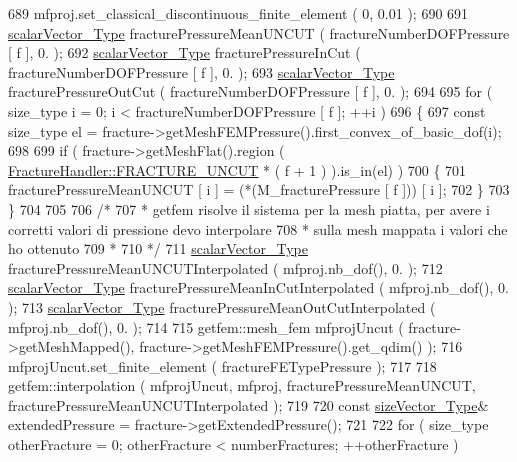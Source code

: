 \begin{DoxyCode}
689         mfproj.set\_classical\_discontinuous\_finite\_element ( 0, 0.01 );
690 
691         \hyperlink{Core_8h_a4e75b5863535ba1dd79942de2846eff0}{scalarVector\_Type} fracturePressureMeanUNCUT ( fractureNumberDOFPressure [ f ], 0. 
      );
692         \hyperlink{Core_8h_a4e75b5863535ba1dd79942de2846eff0}{scalarVector\_Type} fracturePressureInCut ( fractureNumberDOFPressure [ f ], 0. );
693         \hyperlink{Core_8h_a4e75b5863535ba1dd79942de2846eff0}{scalarVector\_Type} fracturePressureOutCut ( fractureNumberDOFPressure [ f ], 0. );
694 
695         \textcolor{keywordflow}{for} ( size\_type i = 0; i < fractureNumberDOFPressure [ f ]; ++i )
696         \{
697             \textcolor{keyword}{const} size\_type el =  fracture->getMeshFEMPressure().first\_convex\_of\_basic\_dof(i);
698         
699             \textcolor{keywordflow}{if} ( fracture->getMeshFlat().region ( 
      \hyperlink{classFractureHandler_a495ad4fc72d0c47c8f0424842f1153aaaa992cc3ad024a030ecd798dc319c95ac}{FractureHandler::FRACTURE\_UNCUT} * ( f + 1 ) ).is\_in(el) )
700             \{   
701                 fracturePressureMeanUNCUT [ i ] = (*(M\_fracturePressure [ f ])) [ i ];
702             \}
703         \}
704 
705         
706         \textcolor{comment}{/*}
707 \textcolor{comment}{         * getfem risolve il sistema per la mesh piatta, per avere i corretti valori di pressione devo
       interpolare}
708 \textcolor{comment}{         * sulla mesh mappata i valori che ho ottenuto}
709 \textcolor{comment}{         * }
710 \textcolor{comment}{         */}
711         \hyperlink{Core_8h_a4e75b5863535ba1dd79942de2846eff0}{scalarVector\_Type} fracturePressureMeanUNCUTInterpolated ( mfproj.nb\_dof(), 0. );
712         \hyperlink{Core_8h_a4e75b5863535ba1dd79942de2846eff0}{scalarVector\_Type} fracturePressureMeanInCutInterpolated ( mfproj.nb\_dof(), 0. );
713         \hyperlink{Core_8h_a4e75b5863535ba1dd79942de2846eff0}{scalarVector\_Type} fracturePressureMeanOutCutInterpolated ( mfproj.nb\_dof(), 0. );
714 
715         getfem::mesh\_fem mfprojUncut ( fracture->getMeshMapped(), fracture->getMeshFEMPressure().get\_qdim()
      );
716         mfprojUncut.set\_finite\_element ( fractureFETypePressure );
717 
718         getfem::interpolation ( mfprojUncut, mfproj, fracturePressureMeanUNCUT, 
      fracturePressureMeanUNCUTInterpolated );
719 
720         \textcolor{keyword}{const} \hyperlink{Core_8h_a83c51913d041a5001e8683434c09857f}{sizeVector\_Type}& extendedPressure = fracture->getExtendedPressure();
721 
722         \textcolor{keywordflow}{for} ( size\_type otherFracture = 0; otherFracture < numberFractures; ++otherFracture )

\end{DoxyCode}
